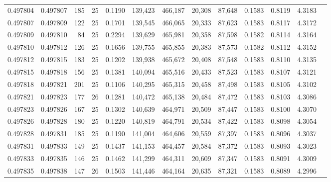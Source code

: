 \begin{tabular}{rrrrrrrrrrrrr}
0.497804 & 0.497807 & 185 &  25 &                                     0.1190 & 139,423 & 466,187 &  20,308 &  87,648 & 0.1583 & 0.8119 & 4.3183 \\
0.497807 & 0.497809 & 122 &  25 &                                     0.1701 & 139,545 & 466,065 &  20,333 &  87,623 & 0.1583 & 0.8117 & 4.3172 \\
0.497809 & 0.497810 &  84 &  25 &                                     0.2294 & 139,629 & 465,981 &  20,358 &  87,598 & 0.1582 & 0.8114 & 4.3164 \\
0.497810 & 0.497812 & 126 &  25 &                                     0.1656 & 139,755 & 465,855 &  20,383 &  87,573 & 0.1582 & 0.8112 & 4.3152 \\
0.497812 & 0.497815 & 183 &  25 &                                     0.1202 & 139,938 & 465,672 &  20,408 &  87,548 & 0.1583 & 0.8110 & 4.3135 \\
0.497815 & 0.497818 & 156 &  25 &                                     0.1381 & 140,094 & 465,516 &  20,433 &  87,523 & 0.1583 & 0.8107 & 4.3121 \\
0.497818 & 0.497821 & 201 &  25 &                                     0.1106 & 140,295 & 465,315 &  20,458 &  87,498 & 0.1583 & 0.8105 & 4.3102 \\
0.497821 & 0.497823 & 177 &  26 &                                     0.1281 & 140,472 & 465,138 &  20,484 &  87,472 & 0.1583 & 0.8103 & 4.3086 \\
0.497823 & 0.497826 & 167 &  25 &                                     0.1302 & 140,639 & 464,971 &  20,509 &  87,447 & 0.1583 & 0.8100 & 4.3070 \\
0.497826 & 0.497828 & 180 &  25 &                                     0.1220 & 140,819 & 464,791 &  20,534 &  87,422 & 0.1583 & 0.8098 & 4.3054 \\
0.497828 & 0.497831 & 185 &  25 &                                     0.1190 & 141,004 & 464,606 &  20,559 &  87,397 & 0.1583 & 0.8096 & 4.3037 \\
0.497831 & 0.497833 & 149 &  25 &                                     0.1437 & 141,153 & 464,457 &  20,584 &  87,372 & 0.1583 & 0.8093 & 4.3023 \\
0.497833 & 0.497835 & 146 &  25 &                                     0.1462 & 141,299 & 464,311 &  20,609 &  87,347 & 0.1583 & 0.8091 & 4.3009 \\
0.497835 & 0.497838 & 147 &  26 &                                     0.1503 & 141,446 & 464,164 &  20,635 &  87,321 & 0.1583 & 0.8089 & 4.2996 \\

\end{tabular}
